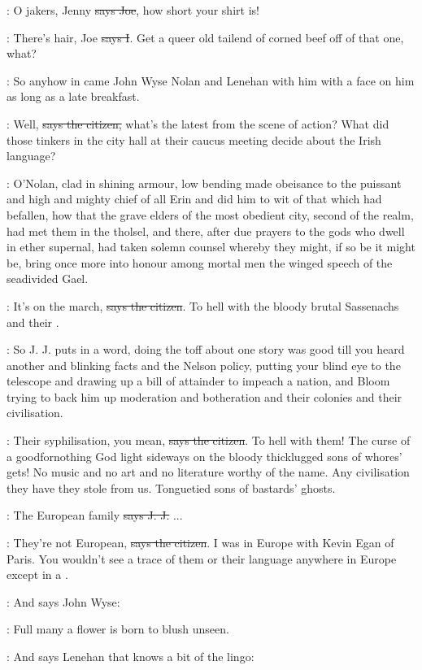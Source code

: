 \joe:
O jakers, Jenny \sout{says Joe},
how short your shirt is!

:
There's hair, Joe \sout{says I}.
Get a queer old tailend of corned beef off of
that one, what?

\Nq:
So anyhow in came John Wyse Nolan and Lenehan with him with a
face on him as long as a late breakfast.

\citizen:
Well, \sout{says the citizen,}
what's the latest from the scene of action? What
did those tinkers in the city hall at their caucus meeting decide about
the Irish language?

:
O'Nolan, clad in shining armour, low bending made obeisance to the
puissant and high and mighty chief of all Erin and did him to wit of that
which had befallen, how that the grave elders of the most obedient city,
second of the realm, had met them in the tholsel, and there, after due
prayers to the gods who dwell in ether supernal, had taken solemn counsel
whereby they might, if so be it might be, bring once more into honour
among mortal men the winged speech of the seadivided Gael.

\citizen:
It's on the march, \sout{says the citizen}.
To hell with the bloody brutal
Sassenachs and their .

\Nq:
So J. J. puts in a word, doing the toff about one story was good till
you heard another and blinking facts and the Nelson policy, putting your
blind eye to the telescope and drawing up a bill of attainder to impeach a
nation, and Bloom trying to back him up moderation and botheration and
their colonies and their civilisation.

\citizen:
Their syphilisation, you mean, \sout{says the citizen}.
To hell with them! The
curse of a goodfornothing God light sideways on the bloody thicklugged
sons of whores' gets! No music and no art and no literature worthy of the
name. Any civilisation they have they stole from us. Tonguetied sons of
bastards' ghosts.

\jjom:
The European family
\sout{says J. J.} ...

\citizen:
They're not European, \sout{says the citizen}.
I was in Europe with Kevin Egan
of Paris. You wouldn't see a trace of them or their language anywhere in
Europe except in a .

\Nq:
And says John Wyse:

\johnwyse:
Full many a flower is born to blush unseen.

\Nq:
And says Lenehan that knows a bit of the lingo:

